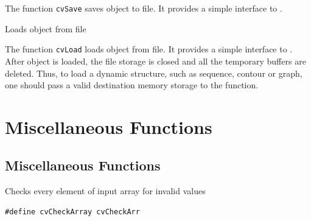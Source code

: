 The function \texttt{cvSave} saves object to file. It provides a simple interface to .

\label{Load}

Loads object from file


\begin{description}
\end{description}

The function \texttt{cvLoad} loads object from file. It provides a
simple interface to . After object is loaded, the file
storage is closed and all the temporary buffers are deleted. Thus,
to load a dynamic structure, such as sequence, contour or graph, one
should pass a valid destination memory storage to the function.

\section{Miscellaneous Functions}

\subsection{Miscellaneous Functions}

\label{CheckArr}

Checks every element of input array for invalid values

\begin{lstlisting}
#define cvCheckArray cvCheckArr
\end{lstlisting}

